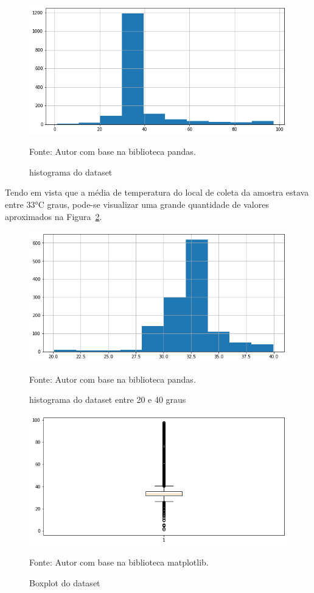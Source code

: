 \begin{figure}[H]
	\centering
	\includegraphics[width=15cm]{imagens/sensores/hist.png}
	\caption{histograma do dataset}
	Fonte: Autor com base na biblioteca pandas.
	\label{fig: hist}
\end{figure}

Tendo em vista que a média de temperatura do local de coleta da amostra estava entre \ang{33}C graus, pode-se visualizar uma grande quantidade de valores aproximados na Figura~\ref{fig: hist2}. 

\begin{figure}[H]
	\centering
	\includegraphics[width=15cm]{imagens/sensores/hist2.png}
	\caption{histograma do dataset entre 20 e 40 graus}
	Fonte: Autor com base na biblioteca pandas.
	\label{fig: hist2}
\end{figure}

\begin{figure}[H]
	\centering
	\includegraphics[width=15cm]{imagens/sensores/boxplot.png}
	\caption{Boxplot do dataset}
	Fonte: Autor com base na biblioteca matplotlib.
	\label{fig: boxplot}
\end{figure}


